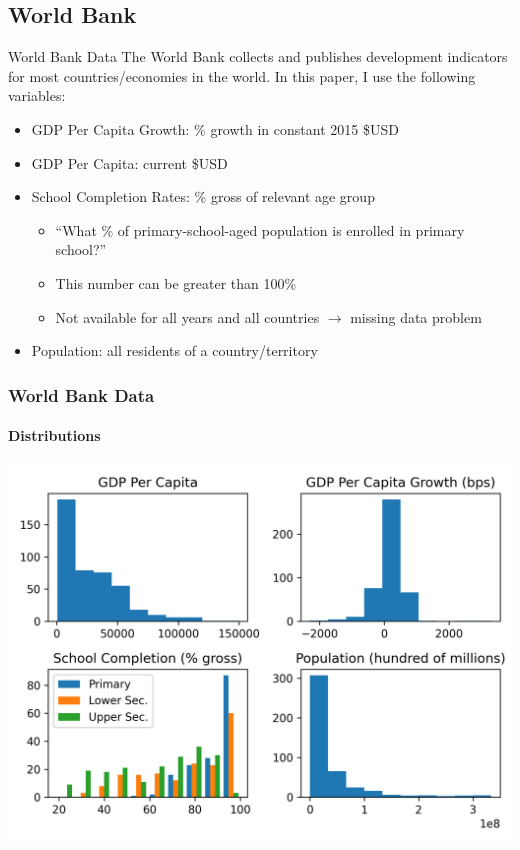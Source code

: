 \documentclass[10pt]{beamer}
\begin{document}
\subsection{World Bank}
\begin{frame}{World Bank Data}
    The World Bank collects and publishes development indicators for most countries/economies in the world. In this paper, I use the following variables:

    \begin{itemize}
        \item GDP Per Capita Growth: \% growth in constant 2015 \$USD
        \item GDP Per Capita: current \$USD
        \item School Completion Rates: \% gross of relevant age group
        \begin{itemize}
            \item ``What \% of primary-school-aged population is enrolled in primary school?''
            \item This number can be greater than 100\%
            \item Not available for all years and all countries $\rightarrow$ missing data problem
        \end{itemize}
        \item Population: all residents of a country/territory
    \end{itemize}
\end{frame}

\begin{frame}
    \frametitle{World Bank Data}
    \framesubtitle{Distributions}
    \centering
    \includegraphics[width=\textwidth]{../charts/wdi.png}
\end{frame}
\end{document}
